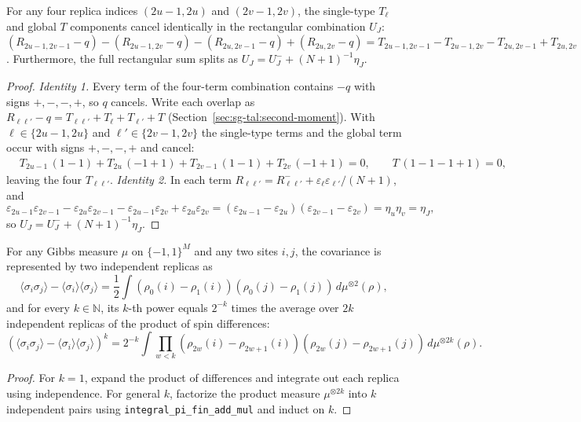 \begin{lemma}\label{lem:sg-tal:hanen-rect-diff}
\leanok
{}
For any four replica indices $(2u-1, 2u)$ and $(2v-1, 2v)$, the single-type $T_\ell$
and global $T$ components cancel identically in the rectangular combination $U_J$:
$(R_{2u-1,2v-1} - q) - (R_{2u-1,2v} - q) - (R_{2u,2v-1} - q) + (R_{2u,2v} - q)
= T_{2u-1,2v-1} - T_{2u-1,2v} - T_{2u,2v-1} + T_{2u,2v}$.
Furthermore, the full rectangular sum splits as $U_J = U_J^- + (N+1)^{-1} \eta_J$.
\end{lemma}
\begin{proof}
\leanok
\emph{Identity 1.} Every term of the four-term combination contains $-q$ with signs $+,-,-,+$, so $q$ cancels. Write each overlap as $R_{\ell\ell'}-q=T_{\ell\ell'}+T_\ell+T_{\ell'}+T$ (Section~\ref{sec:sg-tal:second-moment}). With $\ell\in\{2u-1,2u\}$ and $\ell'\in\{2v-1,2v\}$ the single-type terms and the global term occur with signs $+,-,-,+$ and cancel:
\begin{align*}
&T_{2u-1}\,(1-1)+T_{2u}\,(-1+1)+T_{2v-1}\,(1-1)+T_{2v}\,(-1+1)=0,\qquad T\,(1-1-1+1)=0,
\end{align*}
leaving the four $T_{\ell\ell'}$.
\emph{Identity 2.} In each term $R_{\ell\ell'}=R^-_{\ell\ell'}+\varepsilon_\ell\varepsilon_{\ell'}/(N+1)$, and
\[
\varepsilon_{2u-1}\varepsilon_{2v-1}-\varepsilon_{2u}\varepsilon_{2v-1}-\varepsilon_{2u-1}\varepsilon_{2v}+\varepsilon_{2u}\varepsilon_{2v}
=(\varepsilon_{2u-1}-\varepsilon_{2u})(\varepsilon_{2v-1}-\varepsilon_{2v})=\eta_u\eta_v=\eta_J ,
\]
so $U_J=U_J^-+(N+1)^{-1}\eta_J$.
\end{proof}

\begin{lemma}\label{lem:sg-tal:hanen-cov-powers}
\leanok
{}
For any Gibbs measure $\mu$ on $\{-1, 1\}^M$ and any two sites $i, j$, the covariance is
represented by two independent replicas as
\[
\langle \sigma_i \sigma_j \rangle - \langle \sigma_i \rangle \langle \sigma_j \rangle =
\frac{1}{2} \int (\rho_0(i) - \rho_1(i))(\rho_0(j) - \rho_1(j)) \, d\mu^{\otimes 2}(\rho),
\]
and for every $k \in \mathbb N$, its $k$-th power equals $2^{-k}$ times the average over
$2k$ independent replicas of the product of spin differences:
\[
(\langle \sigma_i \sigma_j \rangle - \langle \sigma_i \rangle \langle \sigma_j \rangle)^k =
2^{-k} \int \prod_{w < k} (\rho_{2w}(i) - \rho_{2w+1}(i))(\rho_{2w}(j) - \rho_{2w+1}(j))
\, d\mu^{\otimes 2k}(\rho).
\]
\end{lemma}
\begin{proof}
\leanok
For $k=1$, expand the product of differences and integrate out each replica using independence.
For general $k$, factorize the product measure $\mu^{\otimes 2k}$ into $k$ independent pairs
using \texttt{integral\_pi\_fin\_add\_mul} and induct on $k$.
\end{proof}

